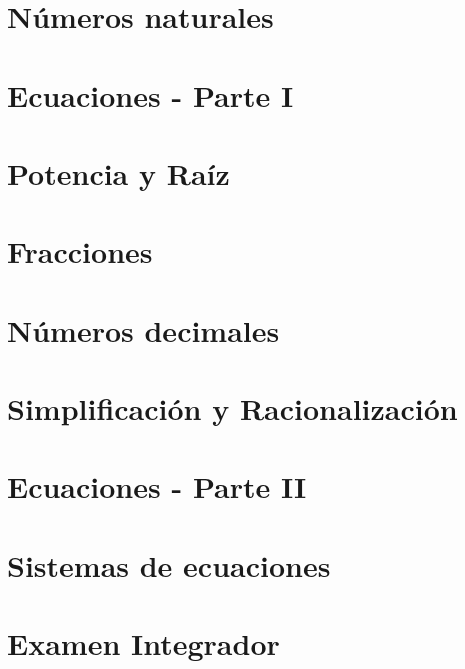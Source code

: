 \documentclass[12pt,letterpaper]{article}
\begin{document}
\begin{titlepage}
                
\end{titlepage}
{
  \hypersetup{linkcolor=black}
  \tableofcontents
}
\bigskip

\newpage
\section{Números naturales}

\newpage
\section{Ecuaciones - Parte I}

\section{Potencia y Raíz}

\section{Fracciones}

\section{Números decimales}

\section{Simplificación y Racionalización}

\section{Ecuaciones - Parte II}

\section{Sistemas de ecuaciones}

\newpage
\section*{Examen Integrador}


      

\bigskip
\end{document}
